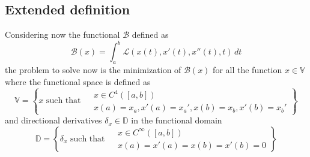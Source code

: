 \subsection*{Extended definition}
	Considering now the functional $\mathcal B$ defined as
	\begin{equation} \label{eq:func:lag2}
		\mathcal B(x) = \int_a^b \mathcal L(x(t),x'(t),x''(t),t)\, dt
	\end{equation}
	the problem to solve now is the minimization of $\mathcal B(x)$ for all the function $x\in \mathds V$ where the functional space is defined as
	\[ \mathds V = \left\{ x \textrm{ such that } \begin{aligned}
		& x\in C^4([a,b]) \\ & x(a) = x_a, x'(a) = x_a', x(b) = x_b, x'(b) = x_b'
	\end{aligned} \right\} \]
	and directional derivatives $\delta_x \in \mathds D$ in the functional domain
	\[ \mathds D = \left\{ \delta_x \textrm{ such that } \begin{aligned}
		& x\in C^\infty([a,b]) \\ & x(a) = x'(a) = x(b) = x'(b) = 0
	\end{aligned} \right\} \]
	
